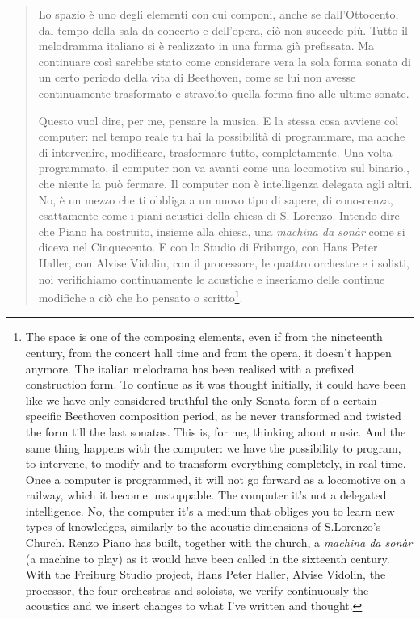 \documentclass[twoside,a4paper]{article}
\begin{document}
\begin{quote}
Lo spazio è uno degli elementi con cui componi, anche se dall'Ottocento, dal tempo della sala da concerto e dell'opera, ciò non succede più. 
Tutto il melodramma italiano si è realizzato in una forma già prefissata. Ma continuare così sarebbe stato come considerare vera la sola forma sonata di un certo periodo della vita di Beethoven, come se lui non avesse continuamente trasformato e stravolto quella forma fino alle ultime sonate. 

Questo vuol dire, per me, pensare la musica. E la stessa cosa avviene col computer: nel tempo reale tu hai la possibilità di programmare, ma anche di intervenire, modificare, trasformare tutto, completamente. Una volta programmato, il computer non va avanti come una locomotiva sul binario., che niente la può fermare. Il computer non è intelligenza delegata agli altri. No, è un mezzo che ti obbliga a un nuovo tipo di sapere, di conoscenza, esattamente come i piani acustici della chiesa di S. Lorenzo. Intendo dire che Piano ha costruito, insieme alla chiesa, una \emph{machina da sonàr} come si diceva nel Cinquecento. E con lo Studio di Friburgo, con Hans Peter Haller, con Alvise Vidolin, con il processore, le quattro orchestre e i solisti, noi verifichiamo continuamente le acustiche e inseriamo delle continue modifiche a ciò che ho pensato o scritto\cite{nono84}\footnote{The space is one of the composing elements, even if from the nineteenth century, from the concert hall time and from the opera, it doesn’t happen anymore. The italian melodrama has been realised with a prefixed construction form. To continue as it was thought initially, it could have been like we have only considered truthful the only Sonata form of a certain specific Beethoven composition period, as he never transformed and twisted the form till the last sonatas. This is, for me, thinking about music. And the same thing happens with the computer: we have the possibility to program, to intervene, to modify and to transform everything completely, in real time. Once a computer is programmed, it will not go forward as a locomotive on a railway, which it become unstoppable. The computer it’s not a delegated intelligence. No, the computer it’s a medium that obliges you to learn new types of knowledges, similarly to the acoustic dimensions of S.Lorenzo’s Church. Renzo Piano has built, together with the church, a \emph{machina da sonàr} (a machine to play) as it would have been called in the sixteenth century. With the Freiburg Studio project, Hans Peter Haller, Alvise Vidolin, the processor, the four orchestras and soloists, we verify continuously the acoustics and we insert changes to what I’ve written and thought.}. 
\end{quote}
\end{document}
